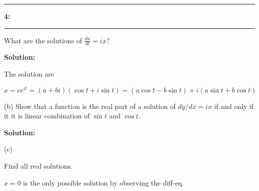 \documentclass[11pt]{article}
\newcommand\question[2]{\vspace{.25in}\hrule\textbf{#1: #2}\vspace{.5em}\hrule\vspace{.10in}}
\begin{document}
\question{4}{}

What are the solutions of $\frac{dx}{dt} = ix$?

\textbf{Solution:}

The solution are 

\[x = ce^{it}=(a+bi)(\cos t +i\sin t)=(a\cos t -b\sin t) + i(a\sin t + b\cos t)\]

(b) Show that a function is the real part of a solution of $dy/dx = ix$ if and only if it it is
linear combination of $\sin t$ and $\cos t$.

\textbf{Solution:}


(c)

Find all real solutions. 

$x = 0$ is the only possible solution by observing the diff-eq.
\end{document}
